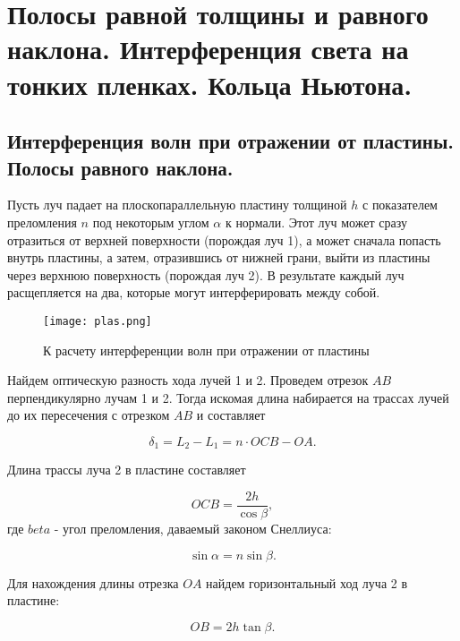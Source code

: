 
\section{Полосы равной толщины и равного наклона. Интерференция света на тонких пленках. Кольца Ньютона.}

\subsection{Интерференция волн при отражении от пластины. Полосы равного наклона.}

Пусть луч падает на плоскопараллельную пластину толщиной  $h$ с показателем преломления $n$ под некоторым углом $\alpha$ к нормали. Этот луч может сразу отразиться от верхней поверхности (порождая луч 1), а может сначала попасть внутрь пластины, а затем, отразившись от нижней грани, выйти из пластины через верхнюю поверхность (порождая луч 2). В результате каждый луч расщепляется на два, которые могут интерферировать между собой.
\begin{figure}[h!]
    \centering
    \texttt{[image: plas.png]}
    \caption{К расчету интерференции волн при отражении от пластины}
    \label{fig:my_label}
\end{figure} 

\bigskip

Найдем оптическую разность хода лучей 1 и 2. Проведем отрезок $AB$ перпендикулярно лучам 1 и 2. Тогда искомая длина набирается на трассах лучей до их пересечения с отрезком $AB$ и составляет

\begin{equation*}
    \delta_1 = L_2 - L_1 = n\cdot OCB - OA.
\end{equation*}

Длина трассы луча 2 в пластине составляет

\begin{equation*}
    OCB = \frac{2h}{\cos\beta},
\end{equation*}
где $beta$ - угол преломления, даваемый законом Снеллиуса:

\begin{equation*}
    \sin\alpha = n\sin\beta.
\end{equation*}


Для нахождения длины отрезка $OA$ найдем горизонтальный ход луча 2 в пластине:

 \begin{equation*}
     OB = 2h\tan\beta .
 \end{equation*}


